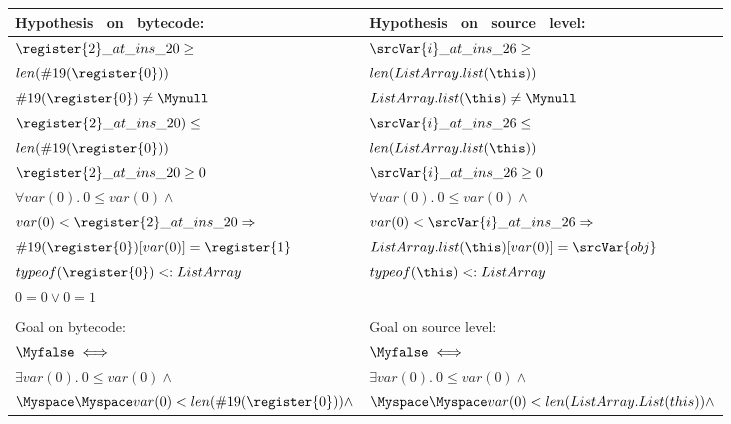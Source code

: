 \begin{figure}[!h]


\begin{tabular}{|l|l|}
\hline
Hypothesis \ on \ bytecode:  & Hypothesis \ on \ source \ level:  \\
\hline 
$\register{2}\_at\_ins\_20 \geq $ 
& $ \srcVar{i}\_at\_ins\_26 \geq$ \\

$len(\#19(\register{0})) $ & $  len(ListArray.list(\this)) $ \\
\hline 

$\#19(\register{0}) \neq \Mynull$ 
& $ ListArray.list(\this) \neq \Mynull$ \\

\hline 
$ \register{2}\_at\_ins\_20) \leq$ 
&  $  \srcVar{i}\_at\_ins\_26  \leq   $ \\
$ len(\#19(\register{0}))  $ & $ len(ListArray.list(\this))  $ \\
\hline

$\register{2}\_at\_ins\_20 \geq 0  $ 
& $ \srcVar{i}\_at\_ins\_26  \geq 0 $ \\

\hline

$\forall  var(0). \  0 \leq var(0) \wedge  $ & $\forall  var(0). \  0 \leq var(0) \wedge $ \\
$ var(0) < \register{2}\_at\_ins\_20 \Rightarrow $ & $  var(0) < \srcVar{i}\_at\_ins\_26 \Rightarrow $\\
$ \#19(\register{0})[var(0)] = \register{1}   $ & $  ListArray.list(\this)[var(0)] = \srcVar{obj}  $ \\

\hline

 $typeof(\register{0}) <: ListArray$ & $typeof( \this) <:  ListArray$  \\
\hline

$0=0 \vee 0=1$ & \\

& \\

\hline
Goal on bytecode: & Goal on source level: \\
\hline
$\Myfalse  \iff $ & $\Myfalse \iff  $ \\
 $ \exists  var(0) . \ 0 \leq var(0) \wedge$ 
& $ \exists  var(0) . \ 0 \leq var(0) \wedge$ \\

$\Myspace \Myspace var(0) < len(\#19(\register{0})) \wedge$ 
& $\Myspace \Myspace  var(0) < len(ListArray.List(this)) \wedge $\\
       

\end{tabular}
\end{figure}
